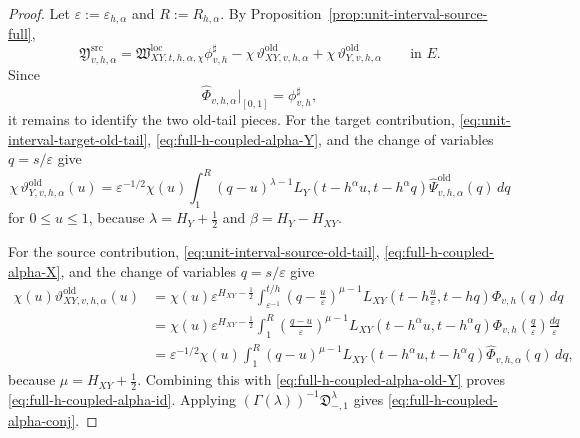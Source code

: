 \documentclass[11pt,a4paper]{amsart}
\theoremstyle{plain}
\theoremstyle{definition}
\theoremstyle{remark}
\begin{document}
\begin{proof}
Let \(\varepsilon:=\varepsilon_{h,\alpha}\) and \(R:=R_{h,\alpha}\). By
Proposition~\ref{prop:unit-interval-source-full},
\[
\mathfrak Y_{v,h,\alpha}^{\mathrm{src}}
\!=\!
\mathfrak W_{XY,t,h,\alpha,\chi}^{\mathrm{loc}}\phi_{v,h}^{\sharp}
-\chi\,\vartheta_{XY,v,h,\alpha}^{\mathrm{old}}
+\chi\,\vartheta_{Y,v,h,\alpha}^{\mathrm{old}}
\qquad\text{in }E.
\]
Since
\[
\widehat\Phi_{v,h,\alpha}|_{[0,1]}
=
\phi_{v,h}^{\sharp},
\]
it remains to identify the two old-tail pieces.
For the target contribution, \eqref{eq:unit-interval-target-old-tail},
\eqref{eq:full-h-coupled-alpha-Y}, and the change of variables \(q=s/\varepsilon\) give
\begin{equation}\label{eq:full-h-coupled-alpha-old-Y}
\chi\,\vartheta_{Y,v,h,\alpha}^{\mathrm{old}}(u)
=
\varepsilon^{-1/2}\chi(u)
\int_1^{R}
(q-u)^{\lambda-1}
L_Y(t-h^\alpha u,t-h^\alpha q)
\widehat\Psi_{v,h,\alpha}^{\mathrm{old}}(q)\,dq
\end{equation}
for \(0\le u\le1\), because \(\lambda=H_Y+\tfrac12\) and \(\beta=H_Y-H_{XY}\).

For the source contribution, \eqref{eq:unit-interval-source-old-tail},
\eqref{eq:full-h-coupled-alpha-X}, and the change of variables \(q=s/\varepsilon\) give
\begin{align*}
\chi(u)\vartheta_{XY,v,h,\alpha}^{\mathrm{old}}(u)
&=
\chi(u)\varepsilon^{H_{XY}-\frac12}
\int_{\varepsilon^{-1}}^{t/h}
\left(
q-\frac{u}{\varepsilon}
\right)^{\mu-1}
L_{XY}\!\left(t-h\frac{u}{\varepsilon},t-hq\right)
\Phi_{v,h}(q)\,dq\\
&=
\chi(u)\varepsilon^{H_{XY}-\frac12}
\int_1^{R}
\left(
\frac{q-u}{\varepsilon}
\right)^{\mu-1}
L_{XY}(t-h^\alpha u,t-h^\alpha q)
\Phi_{v,h}\!\left(\frac{q}{\varepsilon}\right)
\frac{dq}{\varepsilon}\\
&=
\varepsilon^{-1/2}\chi(u)
\int_1^{R}
(q-u)^{\mu-1}
L_{XY}(t-h^\alpha u,t-h^\alpha q)
\widehat\Phi_{v,h,\alpha}(q)\,dq,
\end{align*}
because \(\mu=H_{XY}+\tfrac12\). Combining this with
\eqref{eq:full-h-coupled-alpha-old-Y} proves
\eqref{eq:full-h-coupled-alpha-id}. Applying
\((\Gamma(\lambda))^{-1}\mathfrak D_{-,1}^{\lambda}\) gives
\eqref{eq:full-h-coupled-alpha-conj}.
\end{proof}
\end{document}
